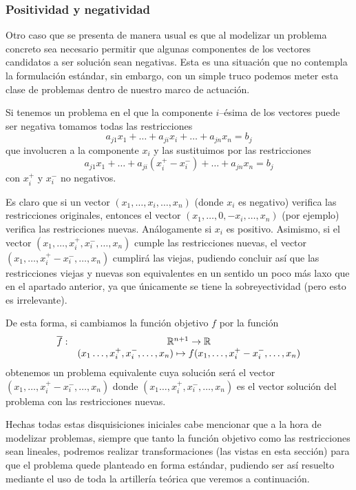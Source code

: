 \subsubsection{Positividad y negatividad}
Otro caso que se presenta de manera usual es que al modelizar un problema concreto sea necesario permitir que algunas componentes de los vectores candidatos a ser solución sean negativas. Esta es una situación que no contempla la formulación estándar, sin embargo, con un simple truco podemos meter esta clase de problemas dentro de nuestro marco de actuación.
\begin{obs}[Truco]
	Si tenemos un problema en el que la componente $i$--ésima de los vectores puede ser negativa tomamos todas las restricciones
	\begin{equation*}
	a_{j1}x_1+\dots+a_{ji}x_i+\dots+a_{jn}x_n=b_j
	\end{equation*}
	que involucren a la componente $x_i$ y las sustituimos por las restricciones
	\begin{equation*}
	a_{j1}x_1+\dots+a_{ji}(x_i^+-x_i^-)+\dots+a_{jn}x_n=b_j
	\end{equation*}
	con $x_i^+$ y $x_i^-$ no negativos.
	
	Es claro que si un vector $(x_1,\dots,x_i,\dots,x_n)$ (donde $x_i$ es negativo) verifica las restricciones originales, entonces el vector $(x_1,\dots,0,-x_i,\dots,x_n)$ (por ejemplo) verifica las restricciones nuevas. Análogamente si $x_i$ es positivo. Asimismo, si el vector $(x_1,\dots,x_i^+,x_i^-,\dots,x_n)$ cumple las restricciones nuevas, el vector $(x_1,\dots,x_i^+-x_i^-,\dots,x_n)$ cumplirá las viejas, pudiendo concluir así que las restricciones viejas y nuevas son equivalentes en un sentido un poco más laxo que en el apartado anterior, ya que únicamente se tiene la sobreyectividad (pero esto es irrelevante).
	
	De esta forma, si cambiamos la función objetivo $f$ por la función
	\begin{equation*}
		\begin{array}{cc}
		\overline{f}:&\mathbb{R}^{n+1}\to \mathbb{R}\\
		& (x_1\dots,x_i^+,x_i^-,\dots,x_n)\mapsto f(x_1,\dots,x_i^+-x_i^-,\dots,x_n)
		\end{array}
	\end{equation*}
	obtenemos un problema equivalente cuya solución será el vector $(x_1,\dots,x_i^+-x_i^-,\dots,x_n)$ donde $(x_1\dots,x_i^+,x_i^-,\dots,x_n)$ es el vector solución del problema con las restricciones nuevas.
\end{obs}
Hechas todas estas disquisiciones iniciales cabe mencionar que a la hora de modelizar problemas, siempre que tanto la función objetivo como las restricciones sean lineales, podremos realizar transformaciones (las vistas en esta sección) para que el problema quede planteado en forma estándar, pudiendo ser así resuelto mediante el uso de toda la artillería teórica que veremos a continuación.
